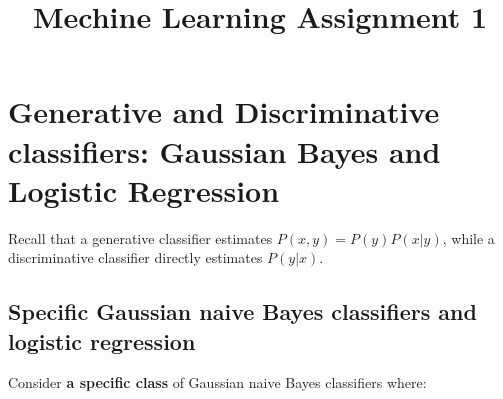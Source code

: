 \documentclass[UTF8,12pt, a4paper]{ctexart}
\title{Mechine Learning Assignment 1}
\author{}
\date{}
\begin{document}
  \maketitle
  \pagestyle{plain}
  \allowdisplaybreaks
  
\section{Generative and Discriminative classifiers: Gaussian Bayes and Logistic Regression} 
\noindent
Recall that a generative classifier estimates $P(x,y)=P(y)P(x|y)$, while a discriminative classifier directly estimates $P(y|x)$.
\subsection{Specific Gaussian naive Bayes classifiers and logistic regression} 

\noindent
Consider \textbf{a specific class} of Gaussian naive Bayes classifiers where:
\end{document}
